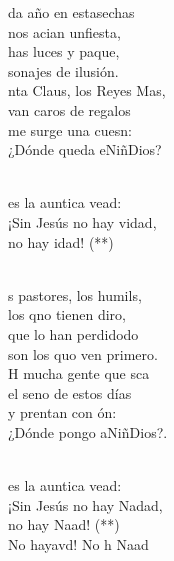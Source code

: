 \begin{cancion}%
	da año en estasechas\\
	nos acian unfiesta,\\
	has luces y paque,\\
	sonajes de ilusión.\\
	nta Claus, los Reyes Mas,\\
	van caros de regalos\\
	me surge una cuesn: \\
	¿Dónde queda eNiñDios? \\\jump\\
	\begin{chorus}%
	es la auntica vead:\\
	¡Sin Jesús no hay vidad, \\
	no hay idad! (**)\\
	\end{chorus}%
	\jump\\
	s pastores, los humils,\\
	los qno tienen diro,\\
	 que lo han perdidodo\\
	son los quo ven primero.\\
	H mucha gente que sca\\
	el seno de estos días\\
	y prentan con ón:\\
	¿Dónde pongo aNiñDios?. \\\jump\\
	\begin{chorus}%
	es la auntica vead:\\
	¡Sin Jesús no hay Nadad, \\
	no hay Naad! (**)\\
	No hayavd! No h Naad\\
	\end{chorus}%
	\jump\\
\end{cancion}%
